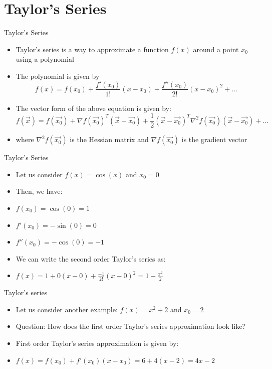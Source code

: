 \documentclass[usenames,dvipsnames]{beamer}
\begin{document}
  
\section{Taylor's Series}
\begin{frame}{Taylor's Series}
    \begin{itemize}[<+->]
        \item Taylor's series is a way to approximate a function $f(x)$ around a point $x_0$ using a polynomial
        \item The polynomial is given by
        \begin{equation}
            f(x) = f(x_0) + \frac{f'(x_0)}{1!}(x-x_0) + \frac{f''(x_0)}{2!}(x-x_0)^2 + \ldots
        \end{equation}
        \item The vector form of the above equation is given by:
        \begin{equation}
            f(\vec{x}) = f(\vec{x_0}) + \nabla f(\vec{x_0})^T(\vec{x}-\vec{x_0}) + \frac{1}{2}(\vec{x}-\vec{x_0})^T\nabla^2 f(\vec{x_0})(\vec{x}-\vec{x_0}) + \ldots
        \end{equation}
        \item where $\nabla^2 f(\vec{x_0})$ is the Hessian matrix and $\nabla f(\vec{x_0})$ is the gradient vector
    \end{itemize}
\end{frame}

    \begin{frame}{Taylor's Series}
        \begin{itemize}[<+->]
            \item Let us consider $f(x) = \cos(x)$ and $x_0 = 0$
            \item Then, we have:
            \item $f(x_0) = \cos(0) = 1$
            \item $f'(x_0) = -\sin(0) = 0$
            \item $f''(x_0) = -\cos(0) = -1$
            \item We can write the second order Taylor's series as:
            \item $f(x) = 1 + 0(x-0) + \frac{-1}{2!}(x-0)^2 = 1 - \frac{x^2}{2}$
        \end{itemize}
        
    \end{frame}

    
    \begin{frame}{Taylor's series}
        \begin{itemize}[<+->]
            \item Let us consider another example: $f(x) = x^2 + 2$ and $x_0 = 2$
            \item Question: How does the first order Taylor's series approximation look like?
            \item First order Taylor's series approximation is given by:
            \item $f(x) = f(x_0) + f'(x_0)(x-x_0) = 6 + 4(x-2) = 4x - 2$
        \end{itemize}
        
    \end{frame}
\end{document}
